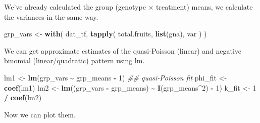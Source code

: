 \documentclass[
  12pt,
]{book}
\newenvironment{Shaded}{\begin{snugshade}}{\end{snugshade}}
\newcommand{\CommentTok}[1]{\textcolor[rgb]{0.56,0.35,0.01}{\textit{#1}}}
\newcommand{\DecValTok}[1]{\textcolor[rgb]{0.00,0.00,0.81}{#1}}
\newcommand{\KeywordTok}[1]{\textcolor[rgb]{0.13,0.29,0.53}{\textbf{#1}}}
\newcommand{\NormalTok}[1]{#1}
\newcommand{\OperatorTok}[1]{\textcolor[rgb]{0.81,0.36,0.00}{\textbf{#1}}}
\newcommand{\StringTok}[1]{\textcolor[rgb]{0.31,0.60,0.02}{#1}}
\begin{document}
We've already calculated the group (genotype × treatment) means, we calculate the variances in the same way.

\begin{Shaded}
\begin{Highlighting}[]
\NormalTok{grp\_vars \textless{}{-}}\StringTok{ }\KeywordTok{with}\NormalTok{(}
\NormalTok{  dat\_tf,}
  \KeywordTok{tapply}\NormalTok{(}
\NormalTok{    total.fruits,}
    \KeywordTok{list}\NormalTok{(gna), var}
\NormalTok{  )}
\NormalTok{)}
\end{Highlighting}
\end{Shaded}

We can get approximate estimates of the quasi-Poisson (linear) and negative binomial (linear/quadratic) pattern using lm.

\begin{Shaded}
\begin{Highlighting}[]
\NormalTok{lm1 \textless{}{-}}\StringTok{ }\KeywordTok{lm}\NormalTok{(grp\_vars }\OperatorTok{\textasciitilde{}}\StringTok{ }\NormalTok{grp\_means }\OperatorTok{{-}}\StringTok{ }\DecValTok{1}\NormalTok{) }\CommentTok{\#\# \textasciigrave{}quasi{-}Poisson\textquotesingle{} fit}
\NormalTok{phi\_fit \textless{}{-}}\StringTok{ }\KeywordTok{coef}\NormalTok{(lm1)}
\NormalTok{lm2 \textless{}{-}}\StringTok{ }\KeywordTok{lm}\NormalTok{((grp\_vars }\OperatorTok{{-}}\StringTok{ }\NormalTok{grp\_means) }\OperatorTok{\textasciitilde{}}\StringTok{ }\KeywordTok{I}\NormalTok{(grp\_means}\OperatorTok{\^{}}\DecValTok{2}\NormalTok{) }\OperatorTok{{-}}\StringTok{ }\DecValTok{1}\NormalTok{)}
\NormalTok{k\_fit \textless{}{-}}\StringTok{ }\DecValTok{1} \OperatorTok{/}\StringTok{ }\KeywordTok{coef}\NormalTok{(lm2)}
\end{Highlighting}
\end{Shaded}

Now we can plot them.
\end{document}
